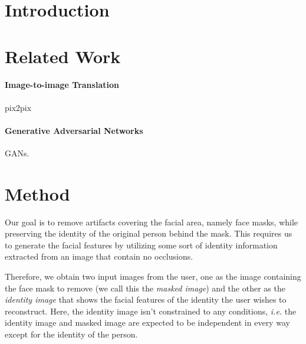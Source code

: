 \documentclass[sigconf]{acmart}
\begin{document}


\maketitle

\section{Introduction}

\section{Related Work}

\paragraph{Image-to-image Translation} {
    pix2pix
}

\paragraph{Generative Adversarial Networks}{
GANs.
}

\section{Method}

Our goal is to remove artifacts covering the facial area, namely face masks,
while preserving the identity of the original person behind the mask. This
requires us to generate the facial features by utilizing some sort of identity
information extracted from an image that contain no occlusions.

Therefore, we obtain two input images from the user, one as the image containing
the face mask to remove (we call this the \emph{masked image}) and the other as
the \emph{identity image} that shows the facial features of the identity the
user wishes to reconstruct. Here, the identity image isn't constrained to any
conditions, \emph{i.e.} the identity image and masked image are expected to be
independent in every way except for the identity of the person.
\end{document}
